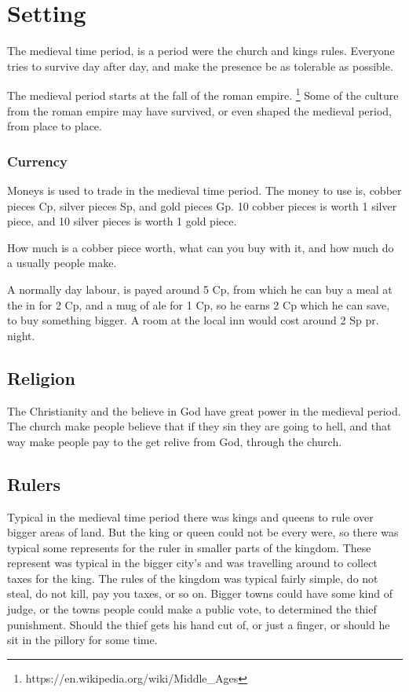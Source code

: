 \chapter{Setting}
The medieval time period, is a period were the church and kings rules.
Everyone tries to survive day after day, and make the presence be as tolerable as possible.

The medieval period starts at the fall of the roman empire. \footnote{https://en.wikipedia.org/wiki/Middle\_Ages}
Some of the culture from the roman empire may have survived, or even shaped the medieval period, from place to place.

\subsection{Currency}
Moneys is used to trade in the medieval time period. The money to use is, cobber pieces Cp, silver pieces Sp, and gold pieces Gp. 10 cobber pieces is worth 1 silver piece, and 10 silver pieces is worth 1 gold piece.

How much is a cobber piece worth, what can you buy with it, and how much do a usually people make.

A normally day labour, is payed around 5 Cp, from which he can buy a meal at the in for 2 Cp, and a mug of ale for 1 Cp, so he earns 2 Cp which he can save, to buy something bigger.
A room at the local inn would cost around 2 Sp pr. night.

\section{Religion}
The Christianity and the believe in God have great power in the medieval period.
The church make people believe that if they sin they are going to hell, and that way make people pay to the get relive from God, through the church.

\section{Rulers}
Typical in the medieval time period there was kings and queens to rule over bigger areas of land.
But the king or queen could not be every were, so there was typical some represents for the ruler in smaller parts of the kingdom.
These represent was typical in the bigger city's and was travelling around to collect taxes for the king.
The rules of the kingdom was typical fairly simple, do not steal, do not kill, pay you taxes, or so on.
Bigger towns could have some kind of judge, or the towns people could make a public vote, to determined the thief punishment.
Should the thief gets his hand cut of, or just a finger, or should he sit in the pillory for some time.
